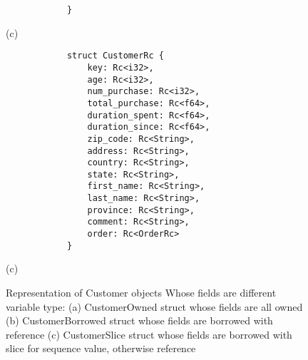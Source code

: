 \begin{figure}[htb]
\begin{minipage}[t]{0.2\linewidth}
\begin{lstlisting}
            }
        \end{lstlisting}
      \medskip
      \centerline{(c)}
    \end{minipage}\hfill
    \begin{minipage}[t]{0.6\linewidth}\centering
        \begin{lstlisting}
            struct CustomerRc {
                key: Rc<i32>,
                age: Rc<i32>,
                num_purchase: Rc<i32>,
                total_purchase: Rc<f64>,
                duration_spent: Rc<f64>,
                duration_since: Rc<f64>,
                zip_code: Rc<String>,
                address: Rc<String>,
                country: Rc<String>,
                state: Rc<String>,
                first_name: Rc<String>,
                last_name: Rc<String>,
                province: Rc<String>,
                comment: Rc<String>,
                order: Rc<OrderRc>
            }
        \end{lstlisting}
      \medskip
      \centerline{(c)}
    \end{minipage}\hfill
    \caption{Representation of Customer objects Whose fields are different variable type: (a) CustomerOwned struct whose fields are all owned 
    (b) CustomerBorrowed struct whose fields are borrowed with reference (c) CustomerSlice struct whose fields are borrowed with slice for sequence value, otherwise reference}
    \label{fig:customer}
 \end{figure}

